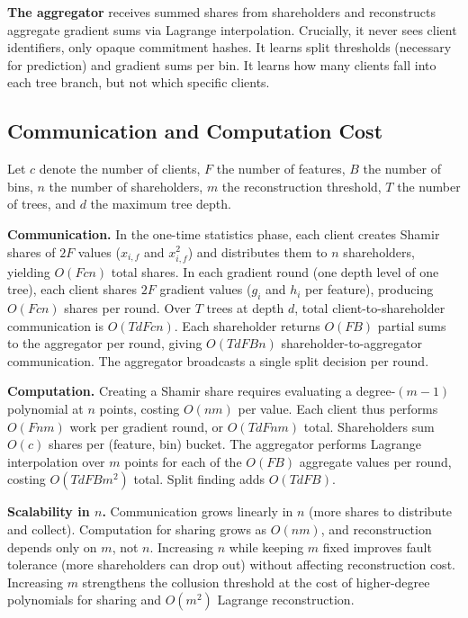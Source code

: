 \documentclass[journal,10pt]{IEEEtran}
\begin{document}
\textbf{The aggregator} receives summed shares from shareholders and reconstructs aggregate gradient sums via Lagrange interpolation. Crucially, it never sees client identifiers, only opaque commitment hashes. It learns split thresholds (necessary for prediction) and gradient sums per bin. It learns how many clients fall into each tree branch, but not which specific clients.

\subsection{Communication and Computation Cost}

Let $c$ denote the number of clients, $F$ the number of features, $B$ the number of bins, $n$ the number of shareholders, $m$ the reconstruction threshold, $T$ the number of trees, and $d$ the maximum tree depth.

\textbf{Communication.} In the one-time statistics phase, each client creates Shamir shares of $2F$ values ($x_{i,f}$ and $x_{i,f}^2$) and distributes them to $n$ shareholders, yielding $O(Fcn)$ total shares. In each gradient round (one depth level of one tree), each client shares $2F$ gradient values ($g_i$ and $h_i$ per feature), producing $O(Fcn)$ shares per round. Over $T$ trees at depth $d$, total client-to-shareholder communication is $O(TdFcn)$. Each shareholder returns $O(FB)$ partial sums to the aggregator per round, giving $O(TdFBn)$ shareholder-to-aggregator communication. The aggregator broadcasts a single split decision per round.

\textbf{Computation.} Creating a Shamir share requires evaluating a degree-$(m{-}1)$ polynomial at $n$ points, costing $O(nm)$ per value. Each client thus performs $O(Fnm)$ work per gradient round, or $O(TdFnm)$ total. Shareholders sum $O(c)$ shares per (feature, bin) bucket. The aggregator performs Lagrange interpolation over $m$ points for each of the $O(FB)$ aggregate values per round, costing $O(TdFBm^2)$ total. Split finding adds $O(TdFB)$.

\textbf{Scalability in $n$.} Communication grows linearly in $n$ (more shares to distribute and collect). Computation for sharing grows as $O(nm)$, and reconstruction depends only on $m$, not $n$. Increasing $n$ while keeping $m$ fixed improves fault tolerance (more shareholders can drop out) without affecting reconstruction cost. Increasing $m$ strengthens the collusion threshold at the cost of higher-degree polynomials for sharing and $O(m^2)$ Lagrange reconstruction.
\end{document}

